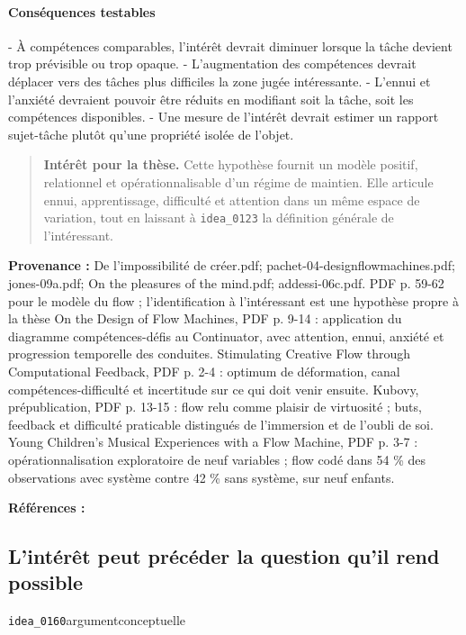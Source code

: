 \documentclass[10pt,a4paper]{article}
\begin{document}
\paragraph{Conséquences testables}
- À compétences comparables, l'intérêt devrait diminuer lorsque la tâche devient trop prévisible ou trop opaque. - L'augmentation des compétences devrait déplacer vers des tâches plus difficiles la zone jugée intéressante. - L'ennui et l'anxiété devraient pouvoir être réduits en modifiant soit la tâche, soit les compétences disponibles. - Une mesure de l'intérêt devrait estimer un rapport sujet-tâche plutôt qu'une propriété isolée de l'objet.

\begin{quote}
\textbf{Intérêt pour la thèse.} Cette hypothèse fournit un modèle positif, relationnel et opérationnalisable d'un régime de maintien. Elle articule ennui, apprentissage, difficulté et attention dans un même espace de variation, tout en laissant à \texttt{idea\_0123} la définition générale de l'intéressant.
\end{quote}
{\footnotesize\color{metadata}\textbf{Provenance :} De l'impossibilité de créer.pdf; pachet-04-designflowmachines.pdf; jones-09a.pdf; On the pleasures of the mind.pdf; addessi-06c.pdf. PDF p. 59-62 pour le modèle du flow ; l'identification à l'intéressant est une hypothèse propre à la thèse On the Design of Flow Machines, PDF p. 9-14 : application du diagramme compétences-défis au Continuator, avec attention, ennui, anxiété et progression temporelle des conduites. Stimulating Creative Flow through Computational Feedback, PDF p. 2-4 : optimum de déformation, canal compétences-difficulté et incertitude sur ce qui doit venir ensuite. Kubovy, prépublication, PDF p. 13-15 : flow relu comme plaisir de virtuosité ; buts, feedback et difficulté praticable distingués de l'immersion et de l'oubli de soi. Young Children's Musical Experiences with a Flow Machine, PDF p. 3-7 : opérationnalisation exploratoire de neuf variables ; flow codé dans 54 \% des observations avec système contre 42 \% sans système, sur neuf enfants.\par}
{\footnotesize\color{metadata}\textbf{Références :} \parencite{pachet2004flowmachines,jones2009stimulating,kubovy1999pleasures,addessi2006flowmachine}\par}

\subsection{L'intérêt peut précéder la question qu'il rend possible}
{\small\color{metadata} \texttt{idea\_0160}\quad\textbullet\quad argument\quad\textbullet\quad conceptuelle\par}
\end{document}
